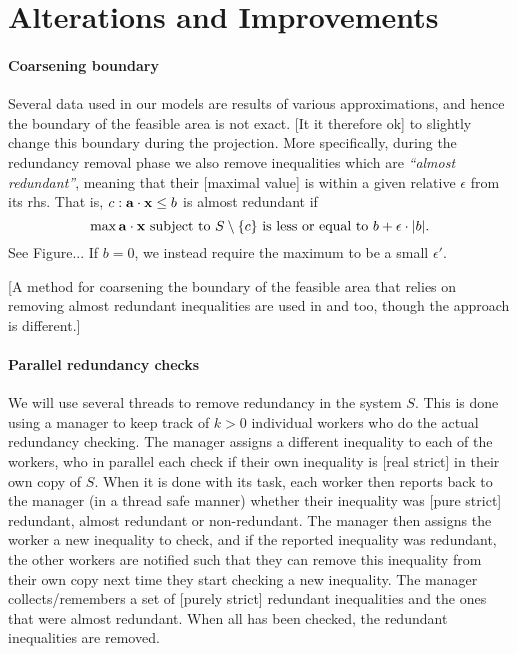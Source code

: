 

\section{Alterations and Improvements}\label{sec:improvements}
\paragraph{Coarsening boundary} 
Several data used in our models are results of various approximations, and hence the boundary of the feasible area is not exact. [It it therefore ok] to slightly change this boundary during the projection. More specifically, during the redundancy removal phase we also remove inequalities which are \emph{``almost redundant''}, meaning that their [maximal value] is within  a given relative $\epsilon$ from its rhs.  That is, $c: \mathbf{a}\cdot\mathbf{x}\leq b$ is almost redundant if
\begin{equation}\label{eq:almostRed}
\max \mathbf{a}\cdot\mathbf{x} \text{ subject to } S\setminus\{c\} \text{ is less or equal to } b + \epsilon\cdot |b|.
\end{equation}
See Figure... If $b=0$, we instead require the maximum to be a small $\epsilon'$. 

[A method for coarsening the boundary of the feasible area that relies on removing almost redundant inequalities are used in \cite{lukatskii08} and \cite{shapot12} too, though the approach is different.]

\paragraph{Parallel redundancy checks}
We will use several threads to remove redundancy in the system $S$. This is done using a manager to keep track of $k>0$ individual workers who do the actual redundancy checking.
The manager assigns a different inequality to each of the workers, who in parallel each check if their own inequality is [real strict] in their own copy of $S$. When it is done with its task, each worker then reports back to the manager (in a thread safe manner) whether their inequality was [pure strict] redundant, almost redundant or non-redundant. The manager then assigns the worker a new inequality to check, and if the reported inequality was redundant, the other workers are notified such that they can remove this inequality from their own copy next time they start checking a new inequality. The manager collects/remembers a set of [purely strict] redundant inequalities and the ones that were almost redundant. When all has been checked, the redundant inequalities are removed.

